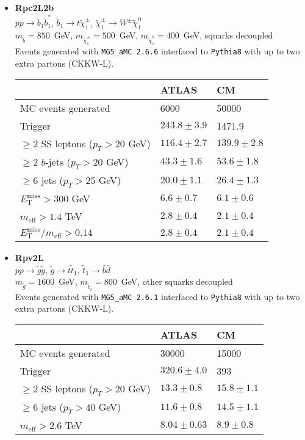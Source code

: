 \documentclass[10pt,fleqn]{article}
\newcommand{\met}{E^\mathrm{miss}_\mathrm{T}}
\newcommand{\meff}{m_\mathrm{eff}}
\begin{document}
\begin{itemize}
 
 \item \textbf{Rpc2L2b}\\ $ p p \to \tilde{b}_1 \tilde{b}_1^* $, $\tilde{b}_1 \to t \tilde{\chi}_1^\pm$, $\tilde{\chi}_1^\pm \to W^\pm \tilde{\chi}_1^0$\\
 $m_{\tilde{b}} = 850$~GeV, $m_{\tilde{\chi}_1^\pm} = 500$~GeV, $m_{\tilde{\chi}_1^0} = 400$~GeV, squarks decoupled\\
 Events generated with \texttt{MG5\_aMC 2.6.6} interfaced to \texttt{Pythia8} with up to two extra partons (CKKW-L).
 \begin{tabular}{l|p{3cm}|p{3cm}} \toprule
                                           &  ATLAS           & CM    \\ \midrule
 MC events generated                       &  6000            & 50000 \\ \midrule
 Trigger                                   & $243.8\pm 3.9 $  &  1471.9  \\
 $\geq 2$ SS leptons ($p_T > 20$ GeV)      & $116.4\pm 2.7$   &  $139.9 \pm 2.8$ \\  
 $\geq 2$ $b$-jets ($p_T > 20$ GeV)        & $43.3 \pm 1.6 $  &  $53.6 \pm 1.8$  \\
 $\geq 6$ jets ($p_T > 25$ GeV)            & $20.0 \pm 1.1 $  &  $26.4 \pm 1.3$\\
 $\met > 300$ GeV                          & $6.6 \pm 0.7$    &  $6.1 \pm 0.6$\\
 $\meff > 1.4$ TeV                         & $2.8 \pm 0.4$    &  $2.1 \pm 0.4$\\
 $\met/\meff > 0.14$                       & $2.8\pm 0.4$     &  $2.1 \pm 0.4$\\   \bottomrule
 \end{tabular} 
 

 \item \textbf{Rpv2L}\\ $ p p \to \tilde{g} \tilde{g} $, $\tilde{g} \to t \tilde{t}_1$, $\tilde{t}_1 \to \bar{b} \bar{d} $\\
 $m_{\tilde{g}} = 1600$~GeV, $m_{\tilde{t}_1} = 800$~GeV, other squarks decoupled\\
 Events generated with \texttt{MG5\_aMC 2.6.1} interfaced to \texttt{Pythia8} with up to two extra partons (CKKW-L).
 \begin{tabular}{l|p{3cm}|p{3cm}} \toprule
                                           &  ATLAS           & CM    \\ \midrule
 MC events generated                       &  30000           &  15000 \\ \midrule
 Trigger                                   & $320.6\pm 4.0 $  &  393 \\
 $\geq 2$ SS leptons ($p_T > 20$ GeV)      & $13.3\pm 0.8$    &  $15.8 \pm 1.1$ \\  
 $\geq 6$ jets ($p_T > 40$ GeV)            & $11.6 \pm 0.8 $  &  $14.5 \pm 1.1$\\
 $\meff > 2.6$ TeV                         & $8.04\pm 0.63$   &  $8.9 \pm 0.8$\\  \bottomrule
 \end{tabular}  
 

\end{itemize}
\end{document}
